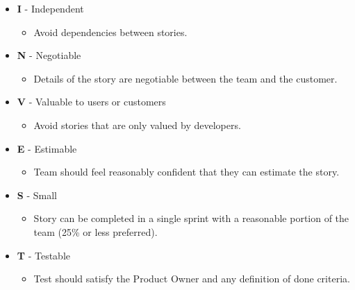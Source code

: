 \documentclass[10pt]{article}
\begin{document}
\begin{multicols}{5}
\begin{block}
  \begin{itemize}
    \item \textbf{I} - Independent
    \begin{itemize}
      \item Avoid dependencies between stories.
    \end{itemize}
    \item \textbf{N} - Negotiable
    \begin{itemize}
      \item Details of the story are negotiable between the team and the customer.
    \end{itemize}
    \item \textbf{V} - Valuable to users or customers
    \begin{itemize}
      \item Avoid stories that are only valued by developers.
    \end{itemize}
    \item \textbf{E} - Estimable
    \begin{itemize}
      \item Team should feel reasonably confident that they can estimate the story.
    \end{itemize}
    \item \textbf{S} - Small
    \begin{itemize}
      \item Story can be completed in a single sprint with a reasonable portion of the team (25\% or less preferred).
    \end{itemize}
    \item \textbf{T} - Testable
    \begin{itemize}
      \item Test should satisfy the Product Owner and any definition of done criteria.
    \end{itemize}
  \end{itemize}
\end{block}




\end{multicols}
\end{document}
